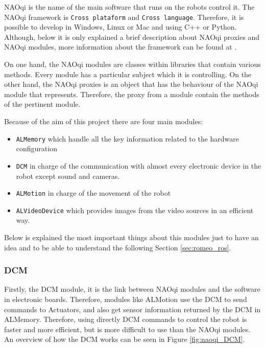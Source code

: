 \documentclass[12pt,a4paper,final,twoside,openright]{report}
\begin{document}
NAOqi is the name of the main software that runs on the robots control it. The NAOqi framework is \texttt{Cross plataform} and \texttt{Cross language}. Therefore, it is possible to develop in Windows, Linux or Mac and using C++ or Python. Although, below it is only explained a brief description about NAOqi proxies and NAOqi modules, more information about the framework can be found at \cite{Aldebaran}. 

On one hand, the NAOqi modules are classes within libraries that contain various methods. Every module has a particular subject which it is controlling. On the other hand, the NAOqi proxies is an object that has the behaviour of the NAOqi module that represents. Therefore, the proxy from a module contain the methods of the pertinent module.

Because of the aim of this project there are four main modules:

\begin{itemize}
\item \texttt{ALMemory} which handle all the key information related to the hardware configuration
\item \texttt{DCM} in charge of the communication with almost every electronic device in the robot except sound and cameras.
\item \texttt{ALMotion} in charge of the movement of the robot
\item \texttt{ALVideoDevice} which provides images from the video sources in an efficient way.
\end{itemize} 

Below is explained the most important things about this modules just to have an idea and to be able to understand the following Section \ref{sec:romeo_ros}.

\subsubsection{DCM}

Firstly, the DCM module, it is the link between NAOqi modules and the software in electronic boards. Therefore, modules like ALMotion use the DCM to send commands to Actuators, and also get sensor information returned by the DCM in ALMemory. Therefore, using directly DCM commands to control the robot is faster and more efficient, but is more difficult to use than the NAOqi modules. An overview of how the DCM works can be seen in Figure \ref{fig:naoqi_DCM}.
\end{document}
